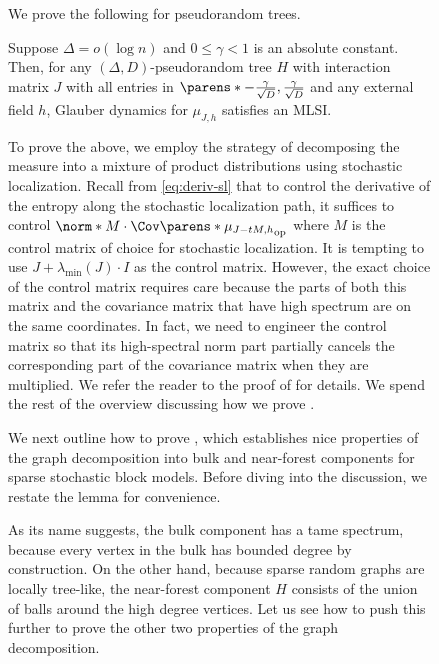 \documentclass[11pt,letterpaper]{article}
\begin{document}
\begin{figure}
We prove the following for pseudorandom trees.
\begin{theorem}
    Suppose $\Delta = o(\log n)$ and $0\le \gamma < 1$ is an absolute constant.
    Then, for any $(\Delta,D)$-pseudorandom tree $H$ with interaction matrix $J$ with all entries in $\parens*{-\frac{\gamma}{\sqrt{D}}, \frac{\gamma}{\sqrt{D}}}$ and any external field $h$, Glauber dynamics for $\mu_{J,h}$ satisfies an MLSI.
\end{theorem}

To prove the above, we employ the strategy of decomposing the measure into a mixture of product distributions using stochastic localization.
Recall from \eqref{eq:deriv-sl} that to control the derivative of the entropy along the stochastic localization path, it suffices to control $\norm*{ M \cdot \Cov\parens*{\mu_{J-tM, h}}}_{\mathrm{op}}$ where $M$ is the control matrix of choice for stochastic localization.
It is tempting to use $J + \lambda_{\min}(J) \cdot I$ as the control matrix.
However, the exact choice of the control matrix requires care because the parts of both this matrix and the covariance matrix that have high spectrum  are on the same coordinates.
In fact, we need to engineer the control matrix so that its high-spectral norm part partially cancels the corresponding part of the covariance matrix when they are multiplied.
We refer the reader to the proof of  for details.
We spend the rest of the overview discussing how we prove .

We next outline how to prove , which establishes nice properties of the graph decomposition into bulk and near-forest components for sparse stochastic block models. 
Before diving into the discussion, we restate the lemma for convenience.
\graphoverview*

As its name suggests, the bulk component has a tame spectrum, because every vertex in the bulk has bounded degree by construction.
On the other hand, because sparse random graphs are locally tree-like, the near-forest component $H$ consists of the union of balls around the high degree vertices. 
Let us see how to push this further to prove the other two properties of the graph decomposition.


\end{figure}
\end{document}
